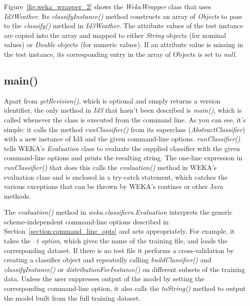 Figure~\ref{fig:weka_wrapper_2} shows the \textit{WekaWrapper} class
that uses \textit{Id3Weather}. Its \textit{classifyInstance()} method
constructs an array of \textit{Objects} to pass to
the \textit{classify()} method in \textit{Id3Weather}. The attribute
values of the test instance are copied into the array and mapped to
either \textit{String} objects (for nominal values) or \textit{Double}
objects (for numeric values). If an attribute value is missing in the
test instance, its corresponding entry in the array of Objects is set
to \textit{null}.

\subsection{main()}

Apart from \textit{getRevision()}, which is optional and simply returns a
version identifier, the only method in \textit{Id3} that hasn't been described
is \textit{main()}, which is called whenever the class is executed from the
command line. As you can see, it's simple: it calls the method
\textit{runClassifier()} from its superclass (\textit{AbstractClassifier}) with a new instance
of Id3 and the given command-line options. \textit{runClassifier()} tells
WEKA's \textit{Evaluation} class to evaluate the supplied classifier with the
given command-line options and prints the resulting string. The
one-line expression in \textit{runClassifier()} that does this calls the
\textit{evaluation()} method in WEKA's evaluation class and is enclosed in a
try-catch statement, which catches the various exceptions that can be
thrown by WEKA's routines or other Java methods.

The \textit{evaluation()} method
in \textit{weka.classifiers.Evaluation} interprets the generic
scheme-independent command-line options described in
Section~\ref{section:command_line_opts} and acts appropriately. For
example, it takes the \textit{--t option}, which gives the name of the training
file, and loads the corresponding dataset. If there is no test file it
performs a cross-validation by creating a classifier object and
repeatedly calling \textit{buildClassifier()} and \textit{classifyInstance()} or
\textit{distributionForInstance()} on different subsets of the training
data. Unless the user suppresses output of the model by setting the
corresponding command-line option, it also calls
the \textit{toString()} method to output the model built from the full
training dataset.

